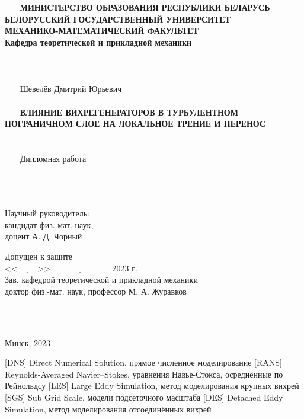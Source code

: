 \def\figurename{Рисунок}
\begin{titlepage}
	\begin{center}
		~~~
		\\
		~~~
		\\
		~~~
		\textbf{МИНИСТЕРСТВО ОБРАЗОВАНИЯ РЕСПУБЛИКИ БЕЛАРУСЬ\\
			БЕЛОРУССКИЙ ГОСУДАРСТВЕННЫЙ УНИВЕРСИТЕТ\\
			МЕХАНИКО-МАТЕМАТИЧЕСКИЙ ФАКУЛЬТЕТ\\
			Кафедра теоретической и прикладной механики\\}
		~~~
		\\
		~~~
		\\
		~~~
		\\
		~~~
		Шевелёв Дмитрий Юрьевич\\
		~~~
		\\
		~~~
		\textbf{ВЛИЯНИЕ ВИХРЕГЕНЕРАТОРОВ В ТУРБУЛЕНТНОМ ПОГРАНИЧНОМ СЛОЕ НА ЛОКАЛЬНОЕ ТРЕНИЕ И ПЕРЕНОС\\}
		~~~
		\\
		~~~
		\\
		~~~
		Дипломная работа\\
		~~~
		\\
		~~~
		\\
		~~~
	\end{center}
	\begin{flushright}
		Научный руководитель:\\
		кандидат физ.-мат. наук,\\
		доцент А. Д. Чорный\\
	\end{flushright}
	\begin{flushleft}
		Допущен к защите\\
		<<$\underline{\hspace{1cm}}$>>$\underline{\hspace{3cm}}$ 2023 г.\\
		Зав. кафедрой теоретической и прикладной механики\\
		доктор физ.-мат. наук, профессор М. А. Журавков
	\end{flushleft}
	~~~
	\\
	~~~
	\begin{center}
		Минск, 2023
	\end{center}
\end{titlepage}
\tableofcontents
\newpage
{}
\begin{acronym}[RANS]
	  [DNS]   {Direct Numerical Solution, прямое численное моделирование}
	 [RANS]  {Reynolds-Averaged Navier–Stokes, уравнения Навье-Стокса, осреднённые по Рейнольдсу}
	  [LES]   {Large Eddy Simulation, метод моделирования крупных вихрей}
	  [SGS]   {Sub Grid Scale, модели подсеточного масштаба}
	  [DES]   {Detached Eddy Simulation, метод моделирования отсоединённых вихрей}
\end{acronym}
\newpage
{}

